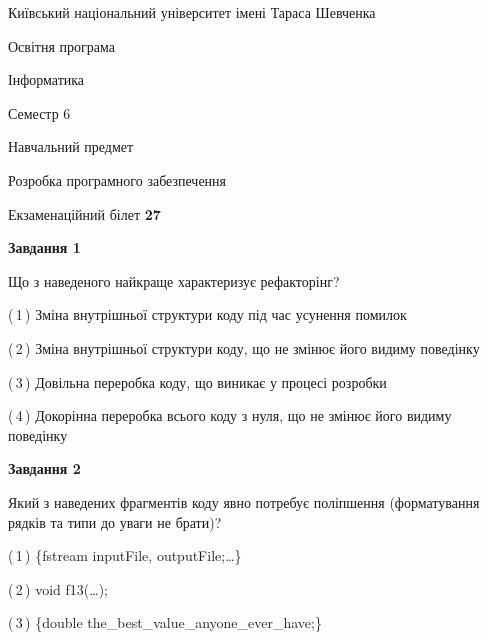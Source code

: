 \documentclass[10pt, ukrainian]{article}
\begin{document}
{{\begin {small}\par
{ \center  Київський національний університет імені Тараса Шевченка \par}
{\parbox {5 cm}{Освітня програма \hfill}{\parbox {7 cm}{Інформатика \hfill}}\parbox {6 cm}{\hfill Семестр 6}}\par
{\parbox {5 cm} {Навчальний предмет \hfill}\parbox {7 cm}{Розробка програмного забезпечення \hfill}\parbox {6cm}{\hfill}\par}\vspace{-7pt} \end{small}}{\center Екзаменаційний білет \No \textbf
{ 27 }\par}}
{
\begin {large}
{\begin {center}\textbf{Завдання 1}\end {center}}\par
Що з наведеного найкраще характеризує рефакторінг?\par
\vspace{2mm}



(\,1\,) Зміна внутрішньої структури коду під час усунення помилок%



(\,2\,) Зміна внутрішньої структури коду, що не змінює його видиму поведінку%



(\,3\,) Довільна переробка коду, що виникає у процесі розробки%



(\,4\,) Докорінна переробка всього коду з нуля,  що не змінює його видиму поведінку%


{\begin {center}\textbf{Завдання 2}\end {center}}\par
Який з наведених фрагментів коду явно потребує поліпшення (форматування рядків та типи до уваги не брати)?\par
\vspace{2mm}



(\,1\,) \{fstream inputFile, outputFile;…\} %



(\,2\,) void f13(…);%



(\,3\,) \{double the\_best\_value\_anyone\_ever\_have;\} %




\end{large}}
\end{document}

